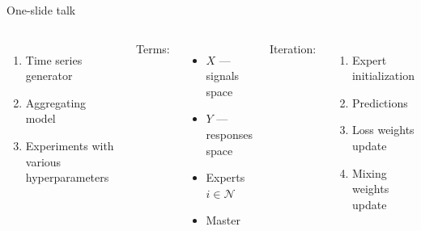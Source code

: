 \documentclass{beamer}
\begin{document}
\begin{frame}{One-slide talk}
\begin{columns}[c]
    \begin{enumerate}
     \item Time series generator 
    \item Aggregating model    
    \item Experiments with various hyperparameters    
    \end{enumerate}
Terms:
    \begin{itemize}
    \item $X$ --- signals space
    \item $Y$ --- responses space
    \item Experts $i \in \mathcal{N}$ 
    \item Master
    \end{itemize}
    Iteration:
    \begin{enumerate}
    \item Expert initialization
    \item Predictions
    \item Loss weights update
    \item Mixing weights update
    \end{enumerate}
\end{columns}



\end{frame}


\end{document}
